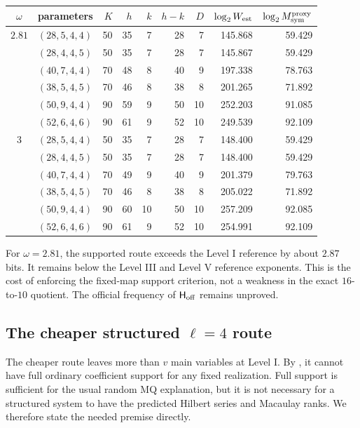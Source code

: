 \documentclass[11pt]{article}
\begin{document}
\begin{center}
\scriptsize
\setlength{\tabcolsep}{3pt}
\begin{tabular}{@{}c l r r r r r r r@{}}
\toprule
$\omega$ & parameters & $K$ & $h$ & $k$ & $h-k$ & $D$
& $\log_2 W_{\rm est}$ & $\log_2 M_{\rm sym}^{\rm proxy}$\\
\midrule
$2.81$ & $(28,5,4,4)$  & 50 & 35 & 7 & 28 & 7  & 145.868 & 59.429\\
       & $(28,4,4,5)$  & 50 & 35 & 7 & 28 & 7  & 145.867 & 59.429\\
       & $(40,7,4,4)$  & 70 & 48 & 8 & 40 & 9  & 197.338 & 78.763\\
       & $(38,5,4,5)$  & 70 & 46 & 8 & 38 & 8  & 201.265 & 71.892\\
       & $(50,9,4,4)$  & 90 & 59 & 9 & 50 & 10 & 252.203 & 91.085\\
       & $(52,6,4,6)$  & 90 & 61 & 9 & 52 & 10 & 249.539 & 92.109\\
\midrule
$3$    & $(28,5,4,4)$  & 50 & 35 & 7 & 28 & 7  & 148.400 & 59.429\\
       & $(28,4,4,5)$  & 50 & 35 & 7 & 28 & 7  & 148.400 & 59.429\\
       & $(40,7,4,4)$  & 70 & 49 & 9 & 40 & 9  & 201.379 & 79.763\\
       & $(38,5,4,5)$  & 70 & 46 & 8 & 38 & 8  & 205.022 & 71.892\\
       & $(50,9,4,4)$  & 90 & 60 & 10 & 50 & 10 & 257.209 & 92.085\\
       & $(52,6,4,6)$  & 90 & 61 & 9 & 52 & 10 & 254.991 & 92.109\\
\bottomrule
\end{tabular}
\end{center}

For $\omega=2.81$, the supported route exceeds the Level I reference by
about $2.87$ bits.  It remains below the Level III and Level V reference
exponents.  This is the cost of enforcing the fixed-map support criterion,
not a weakness in the exact $16$-to-$10$ quotient.  The official frequency
of $\mathsf H_{\rm off}$ remains unproved.

\subsection{The cheaper structured \texorpdfstring{$\ell=4$}{ell=4} route}
\label{sec:pxl-l4-structured}

The cheaper route leaves more than $v$ main variables at Level I.  By
, it cannot have full ordinary coefficient
support for any fixed realization.  Full support is sufficient for the usual
random MQ explanation, but it is not necessary for a structured system to
have the predicted Hilbert series and Macaulay ranks.  We therefore state the
needed premise directly.
\end{document}

